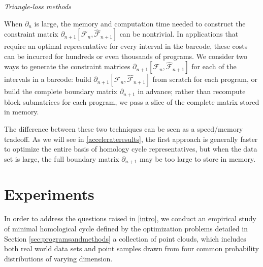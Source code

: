 \emph{Triangle-loss methods}  

When $\partial_n$ is large, the memory and computation time needed to construct the constraint matrix $\partial_{n+1}[\mathcal{F}_n, \hat {\mathcal{F}}_{n+1} ]$ can be nontrivial.  In applications that require an optimal representative for every interval in the barcode, these costs can be incurred for hundreds or even thousands of programs. We consider two ways to generate the constraint matrices $\partial_{n+1}[\mathcal{F}_n, \hat {\mathcal{F}}_{n+1} ]$ for each of the intervals in a barcode: build $\partial_{n+1}[\mathcal{F}_n, \hat {\mathcal{F}}_{n+1} ]$ from scratch for each program, or build the complete boundary matrix $\partial_{n+1}$ in advance; rather than recompute block submatrices for each program, we pass a slice of the complete matrix stored in memory.  

The difference between these two techniques can be seen as a speed/memory tradeoff.  As we will see in \se \ref{accelerateresults}, the first approach is generally faster to optimize the entire basis of homology cycle representatives, but when the data set is large, the full boundary matrix $\partial_{n+1}$ may be too large to store in memory. 


\section{Experiments}\label{methods}


In order to address the questions raised in \se \ref{intro}, we conduct an empirical study of minimal homological cycle \DIFdelbegin {}\DIFdelend \DIFaddbegin {}\DIFaddend defined by the optimization problems detailed in Section \ref{sec:programsandmethods} \DIFdelbegin {}\DIFdelend \DIFaddbegin {}\DIFaddend a collection of point clouds, which includes both real world data sets and point samples drawn from four common probability distributions of varying dimension.  
\newcommand{\sample}{\mathbf{S}}


